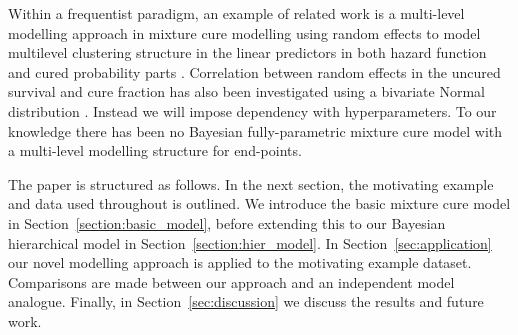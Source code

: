 \documentclass[AMA,STIX1COL]{WileyNJD-v2}
\begin{document}
Within a frequentist paradigm, an example of related work is a multi-level modelling approach in mixture cure modelling using random effects to model multilevel clustering structure in the linear predictors in both hazard function and cured probability parts \cite{Lai2009}.
Correlation between random effects in the uncured survival and cure fraction has also been investigated using a bivariate Normal distribution \cite{Lai2008} \cite{Tan2018}.
Instead we will impose dependency with hyperparameters.
To our knowledge there has been no Bayesian fully-parametric mixture cure model with a multi-level modelling structure for end-points.

The paper is structured as follows.
In the next section, the motivating example and data used throughout is outlined.
We introduce the basic mixture cure model in Section~\ref{section:basic_model}, before extending this to our Bayesian hierarchical model in Section~\ref{section:hier_model}.
In Section~\ref{sec:application} our novel modelling approach is applied to the motivating example dataset.
Comparisons are made between our approach and an independent model analogue.
Finally, in Section~\ref{sec:discussion} we discuss the results and future work.

%
\end{document}
